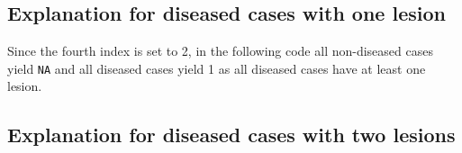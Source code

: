 \documentclass[
]{book}
\newenvironment{Shaded}{\begin{snugshade}}{\end{snugshade}}
\newcommand{\CommentTok}[1]{\textcolor[rgb]{0.56,0.35,0.01}{\textit{#1}}}
\newcommand{\DecValTok}[1]{\textcolor[rgb]{0.00,0.00,0.81}{#1}}
\newcommand{\FunctionTok}[1]{\textcolor[rgb]{0.00,0.00,0.00}{#1}}
\newcommand{\NormalTok}[1]{#1}
\newcommand{\SpecialCharTok}[1]{\textcolor[rgb]{0.00,0.00,0.00}{#1}}
\begin{document}
\begin{Shaded}
\end{Shaded}

\hypertarget{explanation-for-diseased-cases-with-one-lesion}{%
\subsection{Explanation for diseased cases with one lesion}\label{explanation-for-diseased-cases-with-one-lesion}}

Since the fourth index is set to 2, in the following code all non-diseased cases yield \texttt{NA} and all diseased cases yield 1 as all diseased cases have at least one lesion.

\begin{Shaded}
\end{Shaded}

\hypertarget{explanation-for-diseased-cases-with-two-lesions}{%
\subsection{Explanation for diseased cases with two lesions}\label{explanation-for-diseased-cases-with-two-lesions}}
\end{document}

